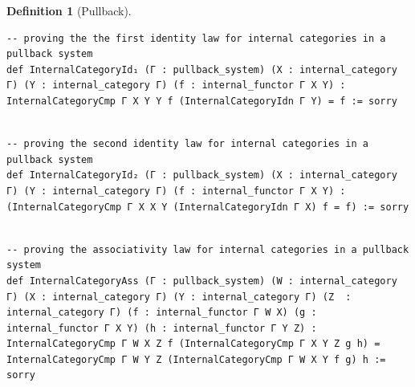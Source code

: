 \documentclass{book}
\theoremstyle{definition}
\newtheorem{definition}{Definition}
\newcounter{lcounter}
\begin{document}
\begin{definition}[Pullback]
\begin{center}
\begin{tcolorbox}[width=5in,colback={white},title={\begin{center}\texttt{Lean \thelcounter} \addtocounter{lcounter}{1}  \end{center}},colbacktitle=Blue,coltitle=black]
\begin{verbatim}
-- proving the the first identity law for internal categories in a pullback system
def InternalCategoryId₁ (Γ : pullback_system) (X : internal_category Γ) (Y : internal_category Γ) (f : internal_functor Γ X Y) : InternalCategoryCmp Γ X Y Y f (InternalCategoryIdn Γ Y) = f := sorry

\end{verbatim}
\end{tcolorbox}
\end{center}

\begin{center}
\begin{tcolorbox}[width=5in,colback={white},title={\begin{center}\texttt{Lean \thelcounter} \addtocounter{lcounter}{1}  \end{center}},colbacktitle=Blue,coltitle=black]
\begin{verbatim}

-- proving the second identity law for internal categories in a pullback system
def InternalCategoryId₂ (Γ : pullback_system) (X : internal_category Γ) (Y : internal_category Γ) (f : internal_functor Γ X Y) : (InternalCategoryCmp Γ X X Y (InternalCategoryIdn Γ X) f = f) := sorry

\end{verbatim}
\end{tcolorbox}
\end{center}

\begin{center}
\begin{tcolorbox}[width=5in,colback={white},title={\begin{center}\texttt{Lean \thelcounter} \addtocounter{lcounter}{1}  \end{center}},colbacktitle=Blue,coltitle=black]
\begin{verbatim}

-- proving the associativity law for internal categories in a pullback system
def InternalCategoryAss (Γ : pullback_system) (W : internal_category Γ) (X : internal_category Γ) (Y : internal_category Γ) (Z  : internal_category Γ) (f : internal_functor Γ W X) (g : internal_functor Γ X Y) (h : internal_functor Γ Y Z) : InternalCategoryCmp Γ W X Z f (InternalCategoryCmp Γ X Y Z g h) = InternalCategoryCmp Γ W Y Z (InternalCategoryCmp Γ W X Y f g) h := sorry


\end{verbatim}
\end{tcolorbox}
\end{center}
\end{definition}
\end{document}

